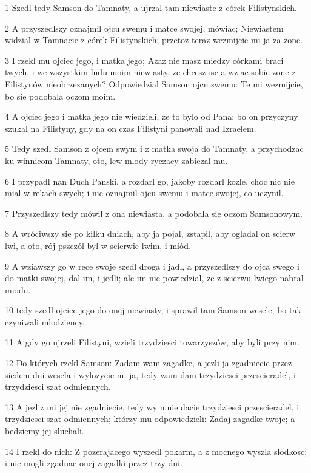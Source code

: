 \par 1 Szedl tedy Samson do Tamnaty, a ujrzal tam niewiaste z córek Filistynskich.
\par 2 A przyszedlszy oznajmil ojcu swemu i matce swojej, mówiac; Niewiastem widzial w Tamnacie z córek Filistynskich; przetoz teraz wezmijcie mi ja za zone.
\par 3 I rzekl mu ojciec jego, i matka jego; Azaz nie masz miedzy córkami braci twych, i we wszystkim ludu moim niewiasty, ze chcesz isc a wziac sobie zone z Filistynów nieobrzezanych? Odpowiedzial Samson ojcu swemu: Te mi wezmijcie, bo sie podobala oczom moim.
\par 4 A ojciec jego i matka jego nie wiedzieli, ze to bylo od Pana; bo on przyczyny szukal na Filistyny, gdy na on czas Filistyni panowali nad Izraelem.
\par 5 Tedy szedl Samson z ojcem swym i z matka swoja do Tamnaty, a przychodzac ku winnicom Tamnaty, oto, lew mlody ryczacy zabiezal mu.
\par 6 I przypadl nan Duch Panski, a rozdarl go, jakoby rozdarl kozle, choc nic nie mial w rekach swych; i nie oznajmil ojcu swemu i matce swojej, co uczynil.
\par 7 Przyszedlszy tedy mówil z ona niewiasta, a podobala sie oczom Samsonowym.
\par 8 A wróciwszy sie po kilku dniach, aby ja pojal, zstapil, aby ogladal on scierw lwi, a oto, rój pszczól byl w scierwie lwim, i miód.
\par 9 A wziawszy go w rece swoje szedl droga i jadl, a przyszedlszy do ojca swego i do matki swojej, dal im, i jedli; ale im nie powiedzial, ze z scierwu lwiego nabral miodu.
\par 10 tedy szedl ojciec jego do onej niewiasty, i sprawil tam Samson wesele; bo tak czyniwali mlodziency.
\par 11 A gdy go ujrzeli Filistyni, wzieli trzydziesci towarzyszów, aby byli przy nim.
\par 12 Do których rzekl Samson: Zadam wam zagadke, a jezli ja zgadniecie przez siedem dni wesela i wylozycie mi ja, tedy wam dam trzydziesci przescieradel, i trzydziesci szat odmiennych.
\par 13 A jezliz mi jej nie zgadniecie, tedy wy mnie dacie trzydziesci przescieradel, i trzydziesci szat odmiennych; którzy mu odpowiedzieli: Zadaj zagadke twoje; a bedziemy jej sluchali.
\par 14 I rzekl do nich: Z pozerajacego wyszedl pokarm, a z mocnego wyszla slodkosc; i nie mogli zgadnac onej zagadki przez trzy dni.
